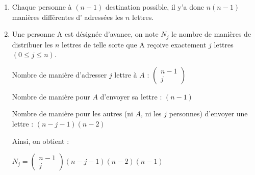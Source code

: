 \documentclass[a4paper,10pt]{article}
\renewcommand{\leq}{\leqslant}
\begin{document}
	\begin{enumerate}
	\item
	Chaque personne à $(n-1)$ destination possible, il y'a donc $n(n-1)$ manières différentes d' adressées les $n$ lettres.
	\item Une personne A est désignée d'avance, on note $N_j$ le nombre de manières de distribuer les $n$ lettres de telle sorte que A reçoive exactement $j $ lettres $(0\leq j \leq n)$. 
	
	Nombre de manière d'adresser $j$ lettre à $A$ : 
		$\left(\begin{array}{c} n-1 \\ j \end{array} \right)$
		
	Nombre de manière pour $A$ d'envoyer sa lettre : $(n-1)$
	
	Nombre de manière pour les autres (ni $A$, ni les $j$ personnes) d'envoyer une lettre : $(n-j-1)(n-2)$
	
	Ainsi, on obtient :
	\begin{center}
		$N_j = \left(\begin{array}{c} n-1 \\ j \end{array} \right)(n-j-1)(n-2)(n-1)$
	 \end{center}
	\end{enumerate}
	
\end{document}
